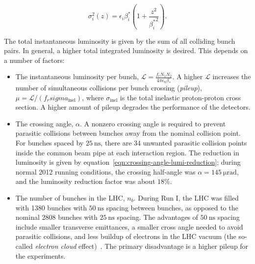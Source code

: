 \begin{equation}
	\sigma_i^2(z)= \epsilon_i \beta^*_i\left(1+\frac{z^2}{{\beta_i^*}^2}\right).
\end{equation}

The total instantaneous luminosity is given by the sum of all colliding bunch pairs. In general, a higher total integrated luminosity is desired. This depends on a number of factors:

\begin{itemize}
	\item The instantaneous luminosity per bunch, $\mathcal{L}=\frac{f_r N_1 N_2}{4\pi\epsilon_n \beta_{*}}$. A higher $\mathcal{L}$ increases the number of simultaneous collisions per bunch crossing (\emph{pileup}), $\mu=\mathcal{L}/(f_r sigma_{\mathrm{inel}})$, where $\sigma_{\mathrm{inel}}$ is the total inelastic proton-proton cross section. A higher amount of pileup degrades the performance of the detectors. 

	\item The crossing angle, $\alpha$. A nonzero crossing angle is required to prevent parasitic collisions between bunches away from the nominal collision point. For bunches spaced by $\SI{25}{\nano\second}$, there are 34 unwanted parasitic collision points inside the common beam pipe at each interaction region. The reduction in luminosity is given by equation~\ref{eqn:crossing-angle-lumi-reduction}; during normal 2012 running conditions, the crossing half-angle was $\alpha=\SI{145}{\micro\radian}$, and the luminosity reduction factor was about $18\%$. 

	\item The number of bunches in the LHC, $n_b$. During Run I, the LHC was filled with 1380 bunches with $\SI{50}{\nano\second}$ spacing between bunches, as opposed to the nominal 2808 bunches with $\SI{25}{\nano\second}$ spacing. The advantages of $\SI{50}{\nano\second}$ spacing include smaller transverse emittances, a smaller cross angle needed to avoid parasitic collisions, and less buildup of electrons in the LHC vacuum (the so-called \emph{electron cloud} effect)~\cite{Papotti:2014vb}. The primary disadvantage is a higher pileup for the experiments. 


\end{itemize}
